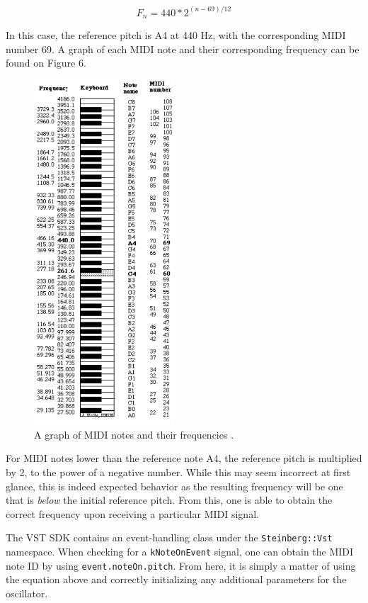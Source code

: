 \documentclass[12pt]{article}
\begin{document}
$$ F_n = 440 * 2^{(n - 69) / 12} $$

In this case, the reference pitch is A4 at 440 Hz, with the corresponding MIDI number 69. A graph of each MIDI note and their corresponding frequency can be found on Figure 6.

\begin{figure}
	\includegraphics[width=5.25cm]{notes.png}
	\caption{A graph of MIDI notes and their frequencies \cite{MIDI_online}.}\label{wrap-fig:1}
\end{figure} 

For MIDI notes lower than the reference note A4, the reference pitch is multiplied by 2, to the power of a negative number. While this may seem incorrect at first glance, this is indeed expected behavior as the resulting frequency will be one that is \textit{below} the initial reference pitch. From this, one is able to obtain the correct frequency upon receiving a particular MIDI signal.

The VST SDK contains an event-handling class under the \verb*|Steinberg::Vst| namespace. When checking for a \verb|kNoteOnEvent| signal, one can obtain the MIDI note ID by using \verb*|event.noteOn.pitch|. From here, it is simply a matter of using the equation above and correctly initializing any additional parameters for the oscillator. 
\end{document}
